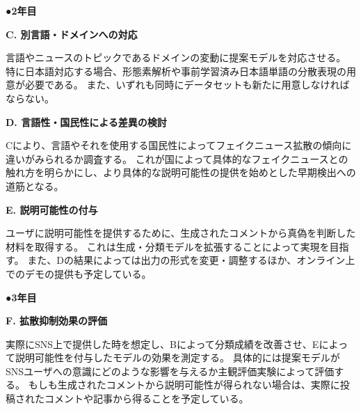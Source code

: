 {	%


	\noindent
	●\textbf{2年目}

	\noindent
	\textbf{C. 別言語・ドメインへの対応}

	言語やニュースのトピックであるドメインの変動に提案モデルを対応させる。
	特に日本語対応する場合、形態素解析や事前学習済み日本語単語の分散表現の用意が必要である。
	また、いずれも同時にデータセットも新たに用意しなければならない。

	\noindent
	\textbf{D. 言語性・国民性による差異の検討}

	Cにより、言語やそれを使用する国民性によってフェイクニュース拡散の傾向に違いがみられるか調査する。
	これが国によって具体的なフェイクニュースとの触れ方を明らかにし、より具体的な説明可能性の提供を始めとした早期検出への道筋となる。

	\noindent
	\textbf{E. 説明可能性の付与}

	ユーザに説明可能性を提供するために、生成されたコメントから真偽を判断した材料を取得する。
	これは生成・分類モデルを拡張することによって実現を目指す。
	また、Dの結果によっては出力の形式を変更・調整するほか、オンライン上でのデモの提供も予定している。

	\noindent
	●\textbf{3年目}

	\noindent
	\textbf{F. 拡散抑制効果の評価}

	実際にSNS上で提供した時を想定し、Bによって分類成績を改善させ、Eによって説明可能性を付与したモデルの効果を測定する。
	具体的には提案モデルがSNSユーザへの意識にどのような影響を与えるか主観評価実験によって評価する。
	もしも生成されたコメントから説明可能性が得られない場合は、実際に投稿されたコメントや記事から得ることを予定している。

}


